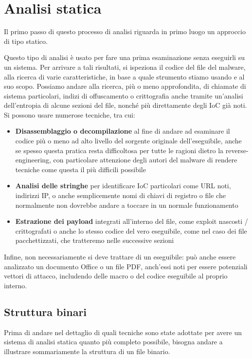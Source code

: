 \chapter{Analisi statica}
Il primo passo di questo processo di analisi riguarda in primo luogo un approccio di tipo statico.

Questo tipo di analisi è usato per fare una prima esaminazione senza eseguirli su un sistema.
Per arrivare a tali risultati, si ispeziona il codice del file del malware, alla ricerca di varie caratteristiche, in base a quale strumento stiamo usando e al suo scopo.
Possiamo andare alla ricerca, più o meno approfondita, di chiamate di sistema particolari, indizi di offuscamento o crittografia anche tramite un'analisi dell'entropia di alcune sezioni del file, nonché più direttamente degli IoC già noti.
Si possono usare numerose tecniche, tra cui:

\begin{itemize}
    \item \textbf{Disassemblaggio o decompilazione} al fine di andare ad esaminare il codice più o meno ad alto livello del sorgente originale dell'eseguibile, anche se spesso questa pratica resta difficoltosa per tutte le ragioni dietro la reverse-engineering, con particolare attenzione degli autori del malware di rendere tecniche come questa il più difficili possibile
    \item \textbf{Analisi delle stringhe} per identificare IoC particolari come URL noti, indirizzi IP, o anche semplicemente nomi di chiavi di registro o file che normalmente non dovrebbe andare a toccare in un normale funzionamento
    \item \textbf{Estrazione dei payload} integrati all'interno del file, come exploit nascosti / crittografati o anche lo stesso codice del vero eseguibile, come nel caso dei file pacchettizzati, che tratteremo nelle successive sezioni
\end{itemize}

Infine, non necessariamente si deve trattare di un eseguibile: può anche essere analizzato un documento Office o un file PDF, anch'essi noti per essere potenziali vettori di attacco, includendo delle macro o del codice eseguibile al proprio interno.

\section{Struttura binari}
\label{chap:static_analysis_binary_structure}
Prima di andare nel dettaglio di quali tecniche sono state adottate per avere un sistema di analisi statica quanto più completo possibile, bisogna andare a illustrare sommariamente la struttura di un file binario.

